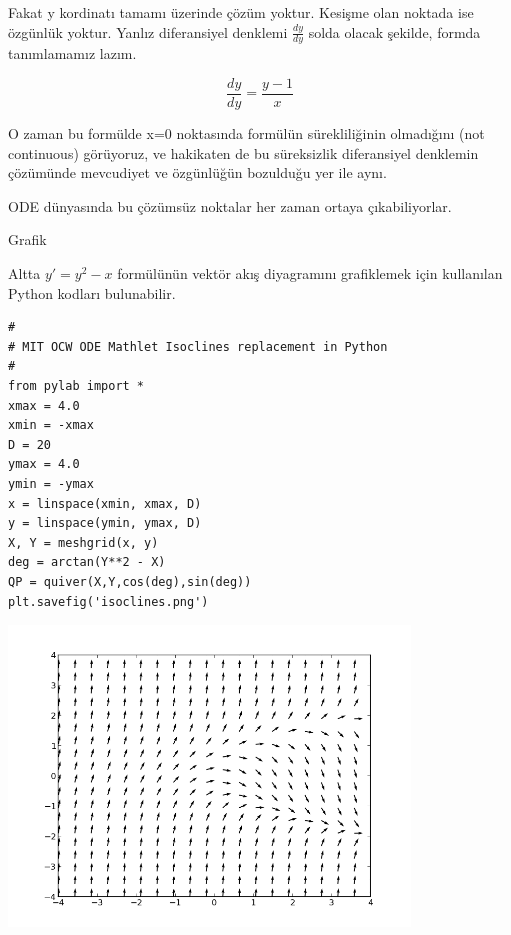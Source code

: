 \documentclass[12pt,fleqn]{article}\usepackage{../../common}
\begin{document}
Fakat y kordinatı tamamı üzerinde çözüm yoktur. Kesişme olan noktada ise
özgünlük yoktur. Yanlız diferansiyel denklemi $\frac{dy}{dy}$ solda olacak
şekilde, formda tanımlamamız lazım. 

$$ \frac{dy}{dy} = \frac{y-1}{x} $$

O zaman bu formülde x=0 noktasında formülün sürekliliğinin olmadığını (not
continuous) görüyoruz, ve hakikaten de bu süreksizlik diferansiyel denklemin
çözümünde mevcudiyet ve özgünlüğün bozulduğu yer ile aynı. 

ODE dünyasında bu çözümsüz noktalar her zaman ortaya çıkabiliyorlar. 

Grafik

Altta $y' = y^2-x$ formülünün vektör akış diyagramını grafiklemek için
kullanılan Python kodları bulunabilir.

\begin{verbatim}
#
# MIT OCW ODE Mathlet Isoclines replacement in Python
#
from pylab import *
xmax = 4.0
xmin = -xmax
D = 20
ymax = 4.0
ymin = -ymax
x = linspace(xmin, xmax, D)
y = linspace(ymin, ymax, D)
X, Y = meshgrid(x, y)
deg = arctan(Y**2 - X)
QP = quiver(X,Y,cos(deg),sin(deg))
plt.savefig('isoclines.png')
\end{verbatim}

\includegraphics[height=8cm]{isoclines.png}
\end{document}
